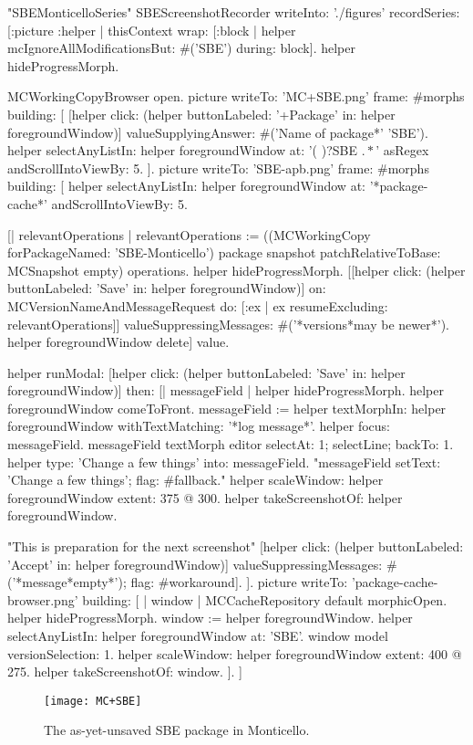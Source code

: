 \documentclass[a4paper,10pt,twoside]{book}
\begin{document}
\begin{ExecuteSmalltalkScript}
"SBEMonticelloSeries"
SBEScreenshotRecorder writeInto: './figures' recordSeries: [:picture :helper |
	thisContext wrap: [:block | helper mcIgnoreAllModificationsBut: #('SBE') during: block].
	helper hideProgressMorph.

	MCWorkingCopyBrowser open.
	picture writeTo: 'MC+SBE.png' frame: #morphs building: [
		[helper click: (helper buttonLabeled: '+Package' in: helper foregroundWindow)]
			valueSupplyingAnswer: #('Name of package*' 'SBE').
		helper selectAnyListIn: helper foregroundWindow at: '(\* )?SBE \(.*\)' asRegex andScrollIntoViewBy: 5.
	].
	picture writeTo: 'SBE-apb.png' frame: #morphs building: [
		helper selectAnyListIn: helper foregroundWindow at: '*package-cache*' andScrollIntoViewBy: 5.

		[| relevantOperations |
		relevantOperations := ((MCWorkingCopy forPackageNamed: 'SBE-Monticello') package snapshot
			patchRelativeToBase: MCSnapshot empty) operations.
		helper hideProgressMorph.
		[[helper click: (helper buttonLabeled: 'Save' in: helper foregroundWindow)]
			on: MCVersionNameAndMessageRequest
			do: [:ex | ex resumeExcluding: relevantOperations]]
				valueSuppressingMessages: #('*versions*may be newer*').
		helper foregroundWindow delete] value.

		helper
			runModal: [helper click: (helper buttonLabeled: 'Save' in: helper foregroundWindow)]
			then: [| messageField |
				helper hideProgressMorph.
				helper foregroundWindow comeToFront.
				messageField := helper textMorphIn: helper foregroundWindow withTextMatching: '*log message*'.
				helper focus: messageField.
				messageField textMorph editor selectAt: 1; selectLine; backTo: 1.
				helper type: 'Change a few things' into: messageField.
				"messageField setText: 'Change a few things'; flag: #fallback."
				helper scaleWindow: helper foregroundWindow extent: 375 @ 300.
				helper takeScreenshotOf: helper foregroundWindow.

				"This is preparation for the next screenshot"
				[helper click: (helper buttonLabeled: 'Accept' in: helper foregroundWindow)]
					valueSuppressingMessages: #('*message*empty*');
					flag: #workaround].
	].
	picture writeTo: 'package-cache-browser.png' building: [
		| window |
		MCCacheRepository default morphicOpen.
		helper hideProgressMorph.
		window := helper foregroundWindow.
		helper selectAnyListIn: helper foregroundWindow at: 'SBE'.
		window model versionSelection: 1.
		helper scaleWindow: helper foregroundWindow extent: 400 @ 275.
		helper takeScreenshotOf: window.
	].
]
\end{ExecuteSmalltalkScript}
\begin{figure}[tbp]
	\begin{center}
		\texttt{[image: MC+SBE]}
	\end{center}
	\caption{The as-yet-unsaved SBE package in Monticello.}
	\label{fig:MC+SBE}
\end{figure}
\end{document}
